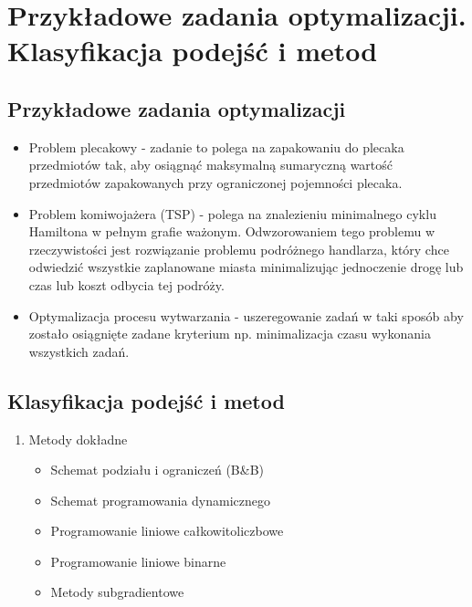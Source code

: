 \section{Przykładowe zadania optymalizacji. Klasyfikacja podejść i metod}
	\subsection{Przykładowe zadania optymalizacji}
	\begin{itemize}
		\item Problem plecakowy - zadanie to polega na zapakowaniu do plecaka przedmiotów
		 tak, aby osiągnąć maksymalną sumaryczną wartość przedmiotów zapakowanych
		 przy ograniczonej pojemności plecaka.
		 \item Problem komiwojażera (TSP) - polega na znalezieniu minimalnego cyklu Hamiltona
		 w pełnym grafie ważonym. Odwzorowaniem tego problemu w rzeczywistości jest 
		 rozwiązanie problemu podróżnego handlarza, który chce odwiedzić wszystkie
		 zaplanowane miasta minimalizując jednoczenie drogę lub czas lub koszt odbycia tej
		 podróży.
		 \item Optymalizacja procesu wytwarzania - uszeregowanie zadań w taki sposób aby
		 zostało osiągnięte zadane kryterium np. minimalizacja czasu wykonania wszystkich
		 zadań.
	\end{itemize}
	\subsection{Klasyfikacja podejść i metod}
	\begin{enumerate}
		\item Metody dokładne
			\begin{itemize}
				\item Schemat podziału i ograniczeń (B\&B)
				\item Schemat programowania dynamicznego
				\item Programowanie liniowe całkowitoliczbowe
				\item Programowanie liniowe binarne
				\item Metody subgradientowe
			\end{itemize}
	\end{enumerate}